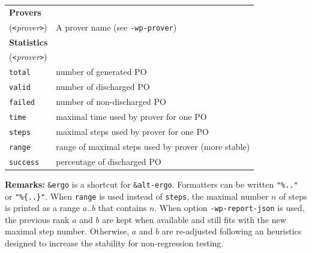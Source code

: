 \begin{center}
  \begin{tabular}{ll}
    \hline
    \textbf{Provers} \\
    (\verb+<+{\it prover}\verb+>+) & A prover name (see \texttt{-wp-prover}) \\
    \hline
    \hline
    \textbf{Statistics} \\
    (\verb+<+{\it prover}\verb+>+) \\
    \verb+total+ & number of generated PO \\
    \verb+valid+ & number of discharged PO \\
    \verb+failed+ & number of non-discharged PO \\
    \verb+time+ & maximal time used by prover for one PO \\
    \verb+steps+ & maximal steps used by prover for one PO \\
    \verb+range+ & range of maximal steps used by prover (more stable)\\
    \verb+success+ & percentage of discharged PO \\
    \hline
  \end{tabular}
\end{center}

\textbf{Remarks:} \verb+&ergo+ is a shortcut for \verb+&alt-ergo+. Formatters
can be written \verb+"%.."+ or \verb+"%{..}"+. When \verb+range+ is used
instead of \verb+steps+, the maximal number $n$ of steps is printed as a range $a..b$ that
contains $n$.
When option \verb+-wp-report-json+ is used, the previous rank $a$ and $b$ are kept when
available and still fits with the new maximal step number. Otherwise, $a$ and $b$ are re-adjusted
following an heuristics designed to increase the stability for non-regression testing.

